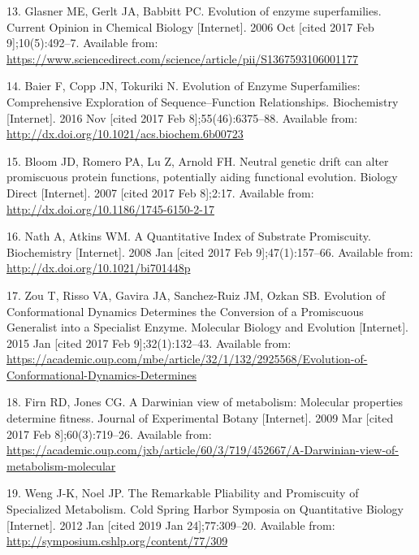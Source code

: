 \documentclass[12pt,twoside]{reedthesis}
\begin{document}
  \hypertarget{ref-glasner_evolution_2006}{}
  13. Glasner ME, Gerlt JA, Babbitt PC. Evolution of enzyme superfamilies.
  Current Opinion in Chemical Biology {[}Internet{]}. 2006 Oct {[}cited
  2017 Feb 9{]};10(5):492--7. Available from:
  \url{https://www.sciencedirect.com/science/article/pii/S1367593106001177}
  
  \hypertarget{ref-baier_evolution_2016}{}
  14. Baier F, Copp JN, Tokuriki N. Evolution of Enzyme Superfamilies:
  Comprehensive Exploration of Sequence--Function Relationships.
  Biochemistry {[}Internet{]}. 2016 Nov {[}cited 2017 Feb
  8{]};55(46):6375--88. Available from:
  \url{http://dx.doi.org/10.1021/acs.biochem.6b00723}
  
  \hypertarget{ref-bloom_neutral_2007}{}
  15. Bloom JD, Romero PA, Lu Z, Arnold FH. Neutral genetic drift can
  alter promiscuous protein functions, potentially aiding functional
  evolution. Biology Direct {[}Internet{]}. 2007 {[}cited 2017 Feb
  8{]};2:17. Available from:
  \url{http://dx.doi.org/10.1186/1745-6150-2-17}
  
  \hypertarget{ref-nath_quantitative_2008}{}
  16. Nath A, Atkins WM. A Quantitative Index of Substrate Promiscuity.
  Biochemistry {[}Internet{]}. 2008 Jan {[}cited 2017 Feb
  9{]};47(1):157--66. Available from:
  \url{http://dx.doi.org/10.1021/bi701448p}
  
  \hypertarget{ref-zou_evolution_2015}{}
  17. Zou T, Risso VA, Gavira JA, Sanchez-Ruiz JM, Ozkan SB. Evolution of
  Conformational Dynamics Determines the Conversion of a Promiscuous
  Generalist into a Specialist Enzyme. Molecular Biology and Evolution
  {[}Internet{]}. 2015 Jan {[}cited 2017 Feb 9{]};32(1):132--43. Available
  from:
  \url{https://academic.oup.com/mbe/article/32/1/132/2925568/Evolution-of-Conformational-Dynamics-Determines}
  
  \hypertarget{ref-firn_darwinian_2009}{}
  18. Firn RD, Jones CG. A Darwinian view of metabolism: Molecular
  properties determine fitness. Journal of Experimental Botany
  {[}Internet{]}. 2009 Mar {[}cited 2017 Feb 8{]};60(3):719--26. Available
  from:
  \url{https://academic.oup.com/jxb/article/60/3/719/452667/A-Darwinian-view-of-metabolism-molecular}
  
  \hypertarget{ref-weng_promiscuity_specialized_pathways_2012}{}
  19. Weng J-K, Noel JP. The Remarkable Pliability and Promiscuity of
  Specialized Metabolism. Cold Spring Harbor Symposia on Quantitative
  Biology {[}Internet{]}. 2012 Jan {[}cited 2019 Jan 24{]};77:309--20.
  Available from: \url{http://symposium.cshlp.org/content/77/309}
  
\end{document}
